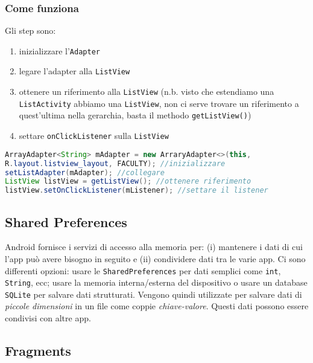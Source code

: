 \subsubsection{Come funziona}

Gli step sono:

\begin{enumerate}
\item inizializzare l'\texttt{Adapter}
\item legare l'adapter alla \texttt{ListView}
\item ottenere un riferimento alla \texttt{ListView} (n.b. visto che estendiamo
una \texttt{ListActivity} abbiamo una \texttt{ListView}, non ci serve trovare un
riferimento a quest'ultima nella gerarchia, basta il methodo
\texttt{getListView()})
\item settare \texttt{onClickListener} sulla \texttt{ListView}
\end{enumerate}

\begin{lstlisting}[language=Java, basicstyle=\footnotesize]
ArrayAdapter<String> mAdapter = new ArraryAdapter<>(this,
R.layout.listview_layout, FACULTY); //inizializzare
setListAdapter(mAdapter); //collegare
ListView listView = getListView(); //ottenere riferimento
listView.setOnClickListener(mListener); //settare il listener
\end{lstlisting}

\subsection{Shared Preferences}

Android fornisce i servizi di accesso alla memoria per: (i) mantenere i dati di
cui l'app può avere bisogno in seguito e (ii) condividere dati tra le varie app.
Ci sono differenti opzioni: usare le \texttt{SharedPreferences} per dati
semplici come \texttt{int}, \texttt{String}, ecc; usare la memoria
interna/esterna del dispositivo o usare un database \texttt{SQLite} per salvare
dati strutturati.
Vengono quindi utilizzate per salvare dati di \textit{piccole dimensioni} in un
file come coppie \textit{chiave-valore}. Questi dati possono essere condivisi
con altre app.

\subsection{Fragments}

